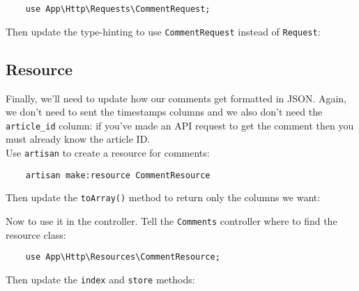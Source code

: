 \begin{verbatim}
    use App\Http\Requests\CommentRequest;
\end{verbatim}

Then update the type-hinting to use \texttt{CommentRequest} instead of \texttt{Request}:





\subsection{Resource}

Finally, we'll need to update how our comments get formatted in JSON. Again, we don't need to sent the timestamps columns and we also don't need the \texttt{article\_id} column: if you've made an API request to get the comment then you must already know the article ID.
\\

Use \texttt{artisan} to create a resource for comments:

\begin{verbatim}
    artisan make:resource CommentResource
\end{verbatim}

\pagebreak

Then update the \texttt{toArray()} method to return only the columns we want:


Now to use it in the controller. Tell the \texttt{Comments} controller where to find the resource class:

\begin{verbatim}
    use App\Http\Resources\CommentResource;
\end{verbatim}

Then update the \texttt{index} and \texttt{store} methods:

